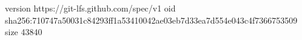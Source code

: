 version https://git-lfs.github.com/spec/v1
oid sha256:710747a50031c84293ff1a53410042ae03eb7d33ea7d554e043c4f7366753509
size 43840
